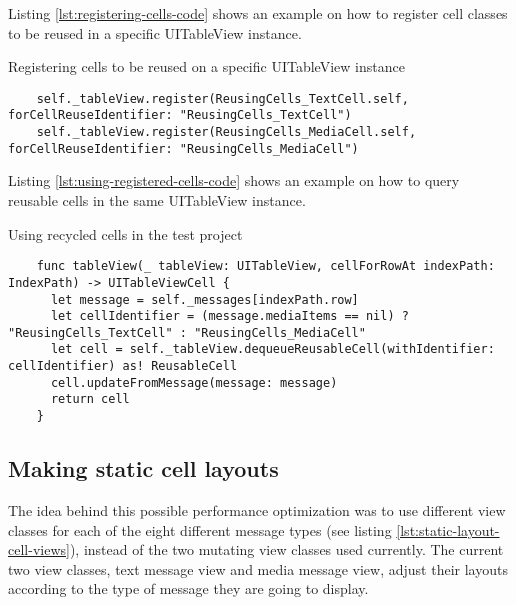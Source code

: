\documentclass[a4paper,12pt]{article}
\begin{document}
Listing \autoref{lst:registering-cells-code} shows an example on how to register cell classes to be reused in a specific UITableView instance.
\begin{listing}[H]
  \caption{Registering cells to be reused on a specific UITableView instance}
  \label{lst:registering-cells-code}
  \begin{verbatim}
    self._tableView.register(ReusingCells_TextCell.self, forCellReuseIdentifier: "ReusingCells_TextCell")
    self._tableView.register(ReusingCells_MediaCell.self, forCellReuseIdentifier: "ReusingCells_MediaCell")
  \end{verbatim}
\end{listing}

Listing \autoref{lst:using-registered-cells-code} shows an example on how to query reusable cells in the same UITableView instance.
\begin{listing}[H]
  \caption{Using recycled cells in the test project}
  \label{lst:using-registered-cells-code}
  \begin{verbatim}
    func tableView(_ tableView: UITableView, cellForRowAt indexPath: IndexPath) -> UITableViewCell {
      let message = self._messages[indexPath.row]
      let cellIdentifier = (message.mediaItems == nil) ? "ReusingCells_TextCell" : "ReusingCells_MediaCell"
      let cell = self._tableView.dequeueReusableCell(withIdentifier: cellIdentifier) as! ReusableCell
      cell.updateFromMessage(message: message)
      return cell
    }
  \end{verbatim}
\end{listing}

\subsection{Making static cell layouts}
The idea behind this possible performance optimization was to use different view classes for each of the eight different message types (see listing \autoref{lst:static-layout-cell-views}), instead of the two mutating view classes used currently. The current two view classes, text message view and media message view, adjust their layouts according to the type of message they are going to display.
\end{document}
